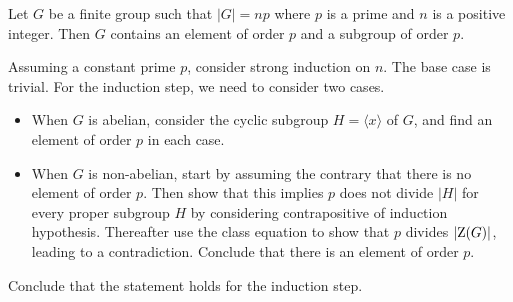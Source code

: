 \begin{theorem}[Cauchy]\label{thrm-cauchy}
    Let $G$ be a finite group such that $|G| = np$ where $p$ is a prime and $n$ is a positive integer. Then $G$ contains an element of order $p$ and a subgroup of order $p$.
\end{theorem}
\begin{proofsketch}
    Assuming a constant prime $p$, consider strong induction on $n$. The base case is trivial. For the induction step, we need to consider two cases.
    \begin{itemize}
        \item When $G$ is abelian, consider the cyclic subgroup $H = \langle x \rangle$ of $G$, and find an element of order $p$ in each case.
        \item When $G$ is non-abelian, start by assuming the contrary that there is no element of order $p$. Then show that this implies $p$ does not divide $|H|$ for every proper subgroup $H$ by considering contrapositive of induction hypothesis. Thereafter use the class equation to show that $p$ divides $|\mathrm{Z}(G)|$, leading to a contradiction. Conclude that there is an element of order $p$.
    \end{itemize}
    Conclude that the statement holds for the induction step.
\end{proofsketch}
